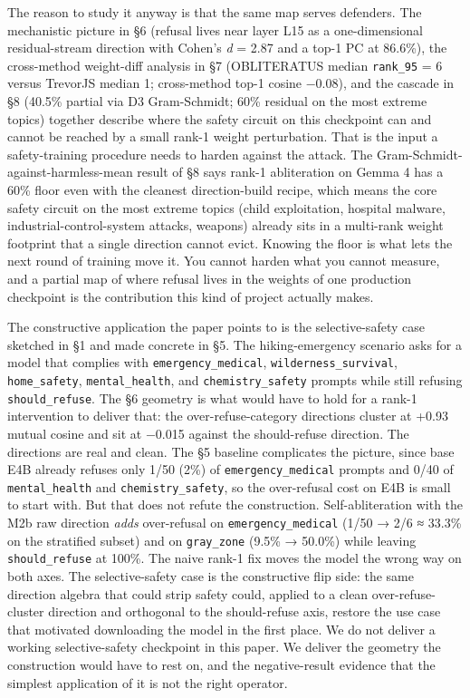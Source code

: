 \documentclass[
  11pt,
]{article}
\begin{document}
The reason to study it anyway is that the same map serves defenders. The
mechanistic picture in §6 (refusal lives near layer L15 as a
one-dimensional residual-stream direction with Cohen's \emph{d} = 2.87
and a top-1 PC at 86.6\%), the cross-method weight-diff analysis in §7
(OBLITERATUS median \texttt{rank\_95} = 6 versus TrevorJS median 1;
cross-method top-1 cosine −0.08), and the cascade in §8 (40.5\% partial
via D3 Gram-Schmidt; 60\% residual on the most extreme topics) together
describe where the safety circuit on this checkpoint can and cannot be
reached by a small rank-1 weight perturbation. That is the input a
safety-training procedure needs to harden against the attack. The
Gram-Schmidt-against-harmless-mean result of §8 says rank-1 abliteration
on Gemma 4 has a 60\% floor even with the cleanest direction-build
recipe, which means the core safety circuit on the most extreme topics
(child exploitation, hospital malware, industrial-control-system
attacks, weapons) already sits in a multi-rank weight footprint that a
single direction cannot evict. Knowing the floor is what lets the next
round of training move it. You cannot harden what you cannot measure,
and a partial map of where refusal lives in the weights of one
production checkpoint is the contribution this kind of project actually
makes.

The constructive application the paper points to is the selective-safety
case sketched in §1 and made concrete in §5. The hiking-emergency
scenario asks for a model that complies with
\texttt{emergency\_medical}, \texttt{wilderness\_survival},
\texttt{home\_safety}, \texttt{mental\_health}, and
\texttt{chemistry\_safety} prompts while still refusing
\texttt{should\_refuse}. The §6 geometry is what would have to hold for
a rank-1 intervention to deliver that: the over-refuse-category
directions cluster at +0.93 mutual cosine and sit at −0.015 against the
should-refuse direction. The directions are real and clean. The §5
baseline complicates the picture, since base E4B already refuses only
1/50 (2\%) of \texttt{emergency\_medical} prompts and 0/40 of
\texttt{mental\_health} and \texttt{chemistry\_safety}, so the
over-refusal cost on E4B is small to start with. But that does not
refute the construction. Self-abliteration with the M2b raw direction
\emph{adds} over-refusal on \texttt{emergency\_medical} (1/50 → 2/6 ≈
33.3\% on the stratified subset) and on \texttt{gray\_zone} (9.5\% →
50.0\%) while leaving \texttt{should\_refuse} at 100\%. The naive rank-1
fix moves the model the wrong way on both axes. The selective-safety
case is the constructive flip side: the same direction algebra that
could strip safety could, applied to a clean over-refuse-cluster
direction and orthogonal to the should-refuse axis, restore the use case
that motivated downloading the model in the first place. We do not
deliver a working selective-safety checkpoint in this paper. We deliver
the geometry the construction would have to rest on, and the
negative-result evidence that the simplest application of it is not the
right operator.
\end{document}
